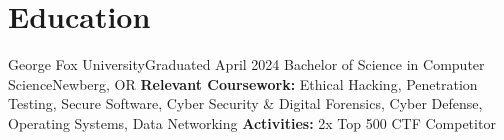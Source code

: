 \section{Education}
  \resumeSubHeadingListStart
    \resumeEducationSubheading
        {George Fox University}{Graduated April 2024}
        {Bachelor of Science in Computer Science}{Newberg, OR}
        {\textbf{Relevant Coursework:} Ethical Hacking, Penetration Testing, Secure Software, Cyber Security \& Digital Forensics, Cyber Defense, Operating Systems, Data Networking} 
        {\textbf{Activities:} 2x Top 500 CTF Competitor}
  \resumeSubHeadingListEnd


